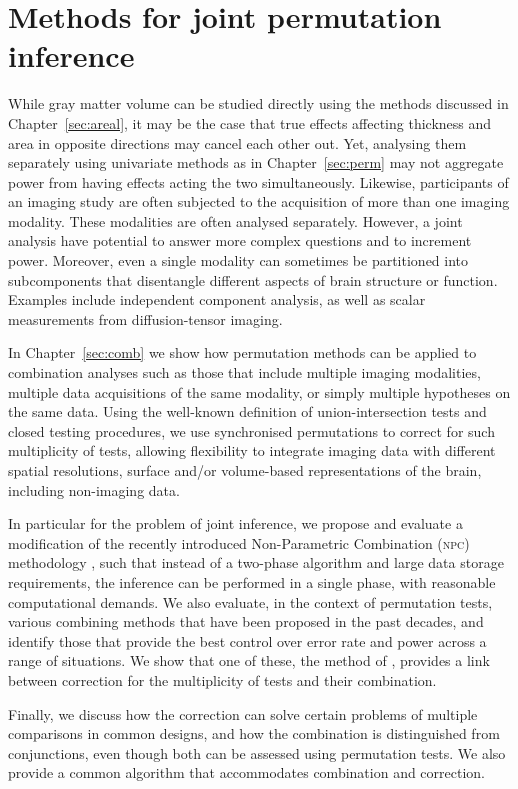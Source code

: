 \section{Methods for joint permutation inference}

While gray matter volume can be studied directly using the methods discussed in Chapter~\ref{sec:areal}, it may be the case that true effects affecting thickness and area in opposite directions may cancel each other out. Yet, analysing them separately using univariate methods as in Chapter~\ref{sec:perm} may not aggregate power from having effects acting the two simultaneously. Likewise, participants of an imaging study are often subjected to the acquisition of more than one imaging modality. These modalities are often analysed separately. However, a joint analysis have potential to answer more complex questions and to increment power. Moreover, even a single modality can sometimes be partitioned into subcomponents that disentangle different aspects of brain structure or function. Examples include independent component analysis, as well as scalar measurements from diffusion-tensor imaging. 

In Chapter~\ref{sec:comb} we show how permutation methods can be applied to combination analyses such as those that include multiple imaging modalities, multiple data acquisitions of the same modality, or simply multiple hypotheses on the same data. Using the well-known definition of union-intersection tests and closed testing procedures, we use synchronised permutations to correct for such multiplicity of tests, allowing flexibility to integrate imaging data with different spatial resolutions, surface and/or volume-based representations of the brain, including non-imaging data. 

In particular for the problem of joint inference, we propose and evaluate a modification of the recently introduced Non-Parametric Combination (\textsc{npc}) methodology \citep{Pesarin2010}, such that instead of a two-phase algorithm and large data storage requirements, the inference can be performed in a single phase, with reasonable computational demands. We also evaluate, in the context of permutation tests, various combining methods that have been proposed in the past decades, and identify those that provide the best control over error rate and power across a range of situations. We show that one of these, the method of \citet{Tippett1931}, provides a link between correction for the multiplicity of tests and their combination.

Finally, we discuss how the correction can solve certain problems of multiple comparisons in common designs, and how the combination is distinguished from conjunctions, even though both can be assessed using permutation tests. We also provide a common algorithm that accommodates combination and correction.